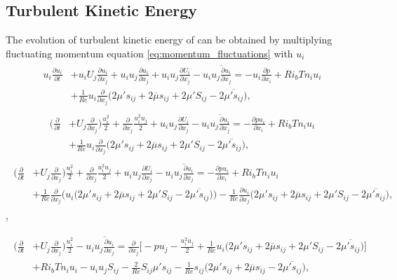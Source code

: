 \documentclass[preprint,12pt]{article}
\begin{document}
\subsection{Turbulent Kinetic Energy}
The evolution of turbulent kinetic energy of can be obtained by multiplying fluctuating momentum equation \eqref{eq:momentum_fluctuations} with $u_i$  
\begin{align}\begin{split}
u_i\frac{\partial u_i}{\partial t}&+u_iU_j\frac{\partial u_i}{\partial x_j}+u_iu_j\frac{\partial u_i}{\partial x_j}+u_iu_j\frac{\partial U_i}{\partial x_j}-u_i\overline{u_j\frac{\partial u_i}{\partial x_j}}=-u_i\frac{\partial {p}}{\partial x_i}+Ri_b{T}n_iu_i\\&+\frac{1}{Re}u_i\frac{\partial}{\partial x_j}\Big(2{{\mu'}}s_{ij}+2{\overline{\mu}}s_{ij}+2{{\mu'}}S_{ij}-2\overline{{\mu}'s_{ij}}\Big),
\end{split}\end{align}
\begin{align}\begin{split}
\Bigg(\frac{\partial}{\partial t}&+U_j\frac{\partial }{\partial x_j}\Bigg)\frac{u_i^2}{2}+\frac{\partial }{\partial x_j}\frac{u_i^2u_j}{2}+u_iu_j\frac{\partial U_i}{\partial x_j}-u_i\overline{u_j\frac{\partial u_i}{\partial x_j}}=-\frac{\partial {pu_i}}{\partial x_i}+Ri_b{T}n_iu_i\\&+\frac{1}{Re}u_i\frac{\partial}{\partial x_j}\Big(2{{\mu'}}s_{ij}+2{\overline{\mu}}s_{ij}+2{{\mu'}}S_{ij}-2\overline{{\mu}'s_{ij}}\Big),
\end{split}\end{align}
\begin{align}\begin{split}
\Bigg(\frac{\partial}{\partial t}&+U_j\frac{\partial }{\partial x_j}\Bigg)\frac{u_i^2}{2}+\frac{\partial }{\partial x_j}\frac{u_i^2u_j}{2}+u_iu_j\frac{\partial U_i}{\partial x_j}-u_i\overline{u_j\frac{\partial u_i}{\partial x_j}}=-\frac{\partial {pu_i}}{\partial x_i}+Ri_b{T}n_iu_i\\&+\frac{1}{Re}\frac{\partial}{\partial x_j}\Bigg(u_i\Big(2{{\mu'}}s_{ij}+2{\overline{\mu}}s_{ij}+2{{\mu'}}S_{ij}-2\overline{{\mu}'s_{ij}}\Big)\Bigg)-\frac{1}{Re}\frac{\partial u_i}{\partial x_j}\Big(2{{\mu'}}s_{ij}+2{\overline{\mu}}s_{ij}+2{{\mu'}}S_{ij}-2\overline{{\mu}'s_{ij}}\Big),
\end{split}\end{align},

\begin{align}\begin{split}
\Bigg(\frac{\partial}{\partial t}&+U_j\frac{\partial }{\partial x_j}\Bigg)\frac{u_i^2}{2}-u_i\overline{u_j\frac{\partial u_i}{\partial x_j}}=\frac{\partial}{\partial x_j}\Bigg[-pu_j-\frac{u_i^2u_j}{2}+\frac{1}{Re}u_i\Big(2{{\mu'}}s_{ij}+2{\overline{\mu}}s_{ij}+2{{\mu'}}S_{ij}-2\overline{{\mu}'s_{ij}}\Big)\Bigg]\\&+Ri_b{T}n_iu_i-u_iu_jS_{ij}-\frac{2}{Re}S_{ij}\mu's_{ij}-\frac{1}{Re}s_{ij}\Big(2{{\mu'}}s_{ij}+2{\overline{\mu}}s_{ij}-2\overline{{\mu}'s_{ij}}\Big),
\end{split}\end{align}
\end{document}
